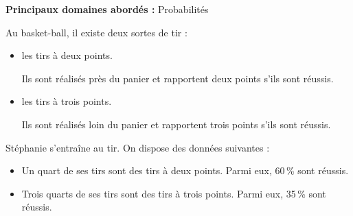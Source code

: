 \textbf{Principaux domaines abordés :} Probabilités

\medskip

Au basket-ball, il existe deux sortes de tir :

\begin{itemize}
\item les tirs à deux points.

Ils sont réalisés près du panier et rapportent deux points s'ils sont réussis.
\item les tirs à trois points.

Ils sont réalisés loin du panier et rapportent trois points s'ils sont réussis.
\end{itemize}

\smallskip

Stéphanie s'entraîne au tir. On dispose des données suivantes :

\begin{itemize}
\item[$\bullet~~$] Un quart de ses tirs sont des tirs à deux points. Parmi eux, 60\,\% sont réussis.
\item[$\bullet~~$] Trois quarts de ses tirs sont des tirs à trois points. Parmi eux, 35\,\% sont réussis.
\end{itemize}

\medskip

